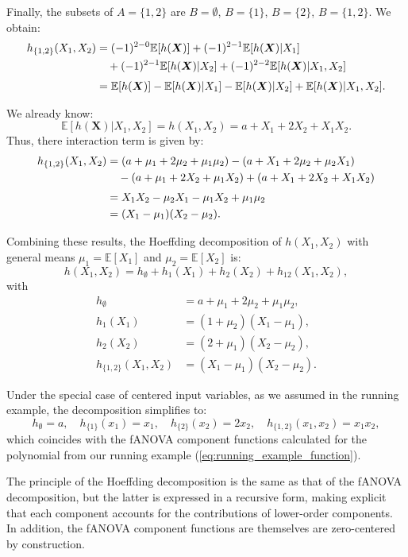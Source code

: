 Finally, the subsets of $A=\{1,2\}$ are 
$B=\emptyset$, $B=\{1\}$, $B=\{2\}$, $B=\{1,2\}$. 
We obtain:
\begin{align*}
h_{\{1,2\}}(X_1,X_2)
&= (-1)^{2-0}\mathbb{E}[h(\boldsymbol{X})]
   + (-1)^{2-1}\mathbb{E}[h(\boldsymbol{X})|X_1] \notag\\
&\quad + (-1)^{2-1}\mathbb{E}[h(\boldsymbol{X})|X_2]
   + (-1)^{2-2}\mathbb{E}[h(\boldsymbol{X})|X_1,X_2] \notag\\[0.3em]
&= \mathbb{E}[h(\boldsymbol{X})]
   - \mathbb{E}[h(\boldsymbol{X})|X_1]
   - \mathbb{E}[h(\boldsymbol{X})|X_2]
   + \mathbb{E}[h(\boldsymbol{X})|X_1,X_2].
\end{align*}

We already know:
\[
\mathbb{E}[h(\boldsymbol{X})|X_1,X_2] = h(X_1,X_2) = a + X_1 + 2X_2 + X_1 X_2.
\]
Thus, there interaction term is given by:
\begin{align}
h_{\{1,2\}}(X_1,X_2)
&= (a+\mu_1+2\mu_2+\mu_1\mu_2)
   - (a+X_1+2\mu_2+\mu_2 X_1) \notag\\
&\quad - (a+\mu_1+2X_2+\mu_1 X_2)
   + (a+X_1+2X_2+X_1 X_2) \notag\\[0.3em]
&= X_1 X_2 - \mu_2 X_1 - \mu_1 X_2 + \mu_1 \mu_2 \notag\\
&= (X_1 - \mu_1)(X_2 - \mu_2).
\end{align}


Combining these results, the Hoeffding decomposition of $h(X_1,X_2)$ with general means 
$\mu_1=\mathbb{E}[X_1]$ and $\mu_2=\mathbb{E}[X_2]$ is:
\[
h(X_1,X_2)
=
h_{\emptyset} + h_1(X_1) + h_2(X_2) + h_{12}(X_1,X_2),
\]
with
\[
\begin{aligned}
h_{\emptyset} &= a + \mu_1 + 2\mu_2 + \mu_1\mu_2, \\[0.3em]
h_1(X_1) &= (1+\mu_2)(X_1 - \mu_1), \\[0.3em]
h_2(X_2) &= (2+\mu_1)(X_2 - \mu_2), \\[0.3em]
h_{\{1,2\}}(X_1,X_2) &= (X_1 - \mu_1)(X_2 - \mu_2).
\end{aligned}
\]

Under the special case of centered input variables, as we assumed in the running example, the decomposition simplifies to:
\[
h_{\emptyset}=a,\quad
h_{\{1\}}(x_1)=x_1,\quad
h_{\{2\}}(x_2)=2x_2,\quad
h_{\{1,2\}}(x_1,x_2)=x_1 x_2,
\]
which coincides with the fANOVA component functions calculated for the polynomial from our running example (\autoref{eq:running_example_function}).\par
The principle of the Hoeffding decomposition is the same as that of the fANOVA decomposition, but the latter is expressed in a recursive form, making explicit that each component accounts for the contributions of lower-order components.
In addition, the fANOVA component functions are themselves are zero-centered by construction.


